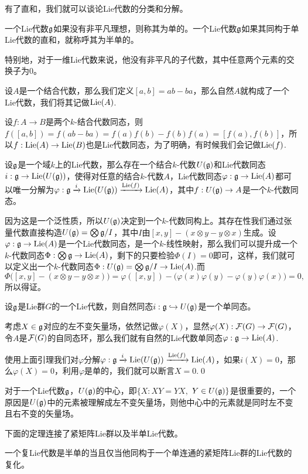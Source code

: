 有了直和，我们就可以谈论Lie代数的分类和分解。

\para 一个Lie代数${\mathfrak{g}}$如果没有非平凡理想，则称其为单的。一个Lie代数${\mathfrak{g}}$如果其同构于单Lie代数的直和，就称呼其为半单的。

特别地，对于一维Lie代数来说，他没有非平凡的子代数，其中任意两个元素的交换子为0。

\para 设$A$是一个结合代数，那么我们定义$[a,b]=ab-ba$，那么自然$A$就构成了一个Lie代数，我们将其记做$\operatorname{Lie}(A)$.

设$f:A\to B$是两个$k$-结合代数同态，则$f([a,b])=f(ab-ba)=f(a)f(b)-f(b)f(a)=[f(a),f(b)]$，所以$f:\operatorname{Lie}(A)\to \operatorname{Lie}(B)$也是Lie代数同态，为了明确，有时候我们会记做$\operatorname{Lie}(f)$. 

\lem 设${\mathfrak{g}}$是一个域$k$上的Lie代数，那么存在一个结合$k$-代数$U({\mathfrak{g}})$和Lie代数同态$i:{\mathfrak{g}}\to \operatorname{Lie}(U({\mathfrak{g}}))$，使得对任意的结合$k$-代数$A$，Lie代数同态$\varphi:{\mathfrak{g}}\to \operatorname{Lie}(A)$都可以唯一分解为$\varphi:{\mathfrak{g}} \xrightarrow{i} \operatorname{Lie}(U({\mathfrak{g}}))\xrightarrow{\operatorname{Lie}(f)}\operatorname{Lie}(A)$，其中$f:U({\mathfrak{g}})\to A$是一个$k$-代数同态。

因为这是一个泛性质，所以$U({\mathfrak{g}})$决定到一个$k$-代数同构上。其存在性我们通过张量代数直接构造$U({\mathfrak{g}})=\bigotimes {\mathfrak{g}}/I$，其中$I$由$[x,y]-(x\otimes y-y\otimes x)$生成。设$\varphi:{\mathfrak{g}}\to \operatorname{Lie}(A)$是一个Lie代数同态，是一个$k$-线性映射，那么我们可以提升成一个$k$-代数同态$\Phi:\bigotimes{\mathfrak{g}}\to \operatorname{Lie}(A)$，剩下的只要检验$\Phi(I)=0$即可，这样，我们就可以定义出一个$k$-代数同态$\Phi:U({\mathfrak{g}})=\bigotimes {\mathfrak{g}}/I\to \operatorname{Lie}(A)$.而
\[
	\Phi\bigl([x,y]-(x\otimes y-y\otimes x)\bigr)=\varphi([x,y])-\bigl(\varphi(x)\varphi(y)-\varphi(y)\varphi(x)\bigr)=0,
\]
所以得证。

\para 设${\mathfrak{g}}$是Lie群$G$的一个Lie代数，则自然同态$i:{\mathfrak{g}}\hookrightarrow U({\mathfrak{g}})$是一个单同态。

\proof 考虑$X\in {\mathfrak{g}}$对应的左不变矢量场，依然记做$\varphi(X)$，显然$\varphi(X):\mathcal{F}(G)\to \mathcal{F}(G)$，令$A$是$\mathcal{F}(G)$的自同态环，那么我们就有自然的Lie代数单同态$\varphi:{\mathfrak{g}} \to \mathrm{Lie}(A)$.

使用上面引理我们对$\varphi$分解$\varphi:{\mathfrak{g}} \xrightarrow{i} \operatorname{Lie}(U({\mathfrak{g}}))\xrightarrow{\operatorname{Lie}(f)}\operatorname{Lie}(A)$，如果$i(X)=0$，那么$\varphi(X)=0$，利用$\varphi$是单的，我们就可以断言$X=0$.\qed

\para 对于一个Lie代数${\mathfrak{g}}$，$U({\mathfrak{g}})$的中心，即$\{X:XY=YX,$ $Y\in U({\mathfrak{g}})\}$是很重要的，一个原因是$U({\mathfrak{g}})$中的元素被理解成左不变矢量场，则他中心中的元素就是同时左不变且右不变的矢量场。

下面的定理连接了紧矩阵Lie群以及半单Lie代数。

\theo 一个复Lie代数是半单的当且仅当他同构于一个单连通的紧矩阵Lie群的Lie代数的复化。

